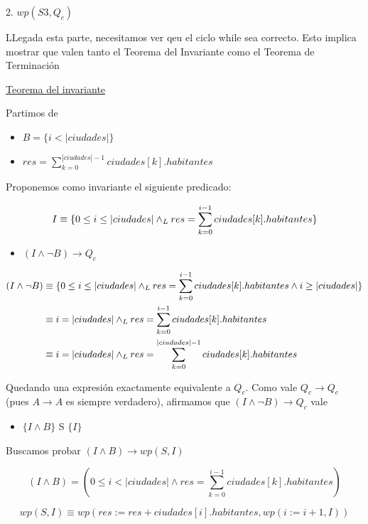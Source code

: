 \documentclass[10pt,a4paper]{article}
\begin{document}
\begin {enumerate}
    2. $wp(S3, Q_{c})$

    LLegada esta parte, necesitamos ver qeu el ciclo while sea correcto. Esto implica mostrar que valen tanto el Teorema del Invariante como el 
    Teorema de Terminación

    \underline{Teorema del invariante}

    Partimos de 

    \begin{itemize}
        \item $B = \{i < |ciudades| \}$
        \item $res =  \sum\limits_{k=0}^{|ciudades| - 1}{ciudades[k].habitantes}$
    \end{itemize}

    Proponemos como invariante el siguiente predicado: 

    $$I \equiv \{0 \leq i \leq |ciudades| \land _L res = \sum\limits_{k=0}^{i - 1}{ciudades[k].habitantes}\}$$

    \begin{itemize}
        \item $(I \land \neg B) \to Q_{c}$
    \end{itemize}

    \begin{align*}
        (I \land \neg B) &\equiv \{0 \leq i \leq |ciudades| \land _L res = \sum\limits_{k=0}^{i - 1}{ciudades[k].habitantes} \land i \geq |ciudades|\} \\
        &\equiv i = |ciudades| \land _L res = \sum\limits_{k=0}^{i - 1}{ciudades[k].habitantes} \\
        &\equiv i = |ciudades| \land _L res = \sum\limits_{k=0}^{|ciudades| - 1}{ciudades[k].habitantes}
    \end{align*}

    Quedando una expresión exactamente equivalente a $Q_{c}$. Como vale $Q_{c} \to Q_{c}$ (pues $A \to A$ es siempre verdadero), afirmamos que $(I \land \neg B) \to Q_{c}$ vale 


    \begin{itemize}
    \item $ \{I \land B\}$ S $\{I\}$
    \end{itemize}

    Buscamos probar $(I \land B) \to wp(S, I)$

    $$ (I \land B) = (0 \leq i < |ciudades| \land res = \sum\limits_{k=0}^{i - 1}{ciudades[k].habitantes})$$

    $$wp(S, I) \equiv wp(res := res + ciudades[i].habitantes, wp(i := i + 1, I))$$


\end{enumerate}
\end{document}
